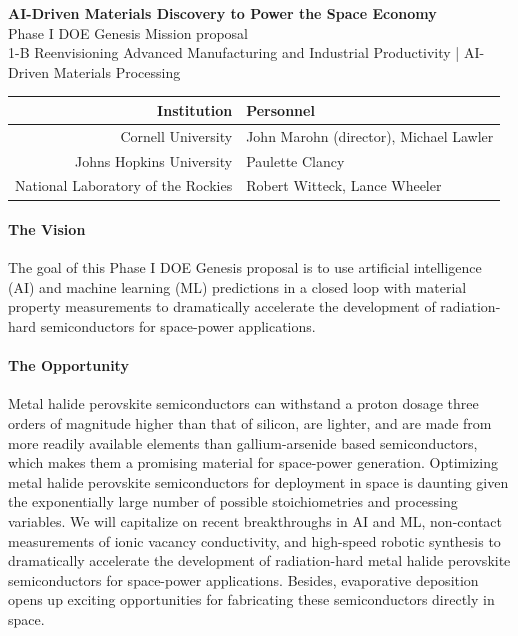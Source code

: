 \documentclass[../main.tex]{subfiles}
\begin{document}
\thispagestyle{empty}

\begin{center}
{
  \large
  \textbf{AI-Driven Materials Discovery to Power the Space Economy}
} 
\vspace{6pt} \\
Phase I DOE Genesis Mission proposal \\
1-B  Reenvisioning Advanced Manufacturing and Industrial Productivity | AI-Driven Materials Processing
\end{center}


\vspace{-6pt}

\begin{center}
\begin{tabular}{rl}
\toprule
\textbf{Institution} & \textbf{Personnel} \\
\midrule
Cornell University &  John Marohn (director), Michael Lawler  \\
Johns Hopkins University &  Paulette Clancy \\ 
National Laboratory of the Rockies & Robert Witteck, Lance Wheeler  \\
\bottomrule
\end{tabular}
\end{center}

\vspace{6pt}


\paragraph{The Vision} 
The goal of this Phase I DOE Genesis proposal is to use artificial intelligence (AI) and machine learning (ML) predictions in a closed loop with material property measurements to dramatically accelerate the development of radiation-hard semiconductors for space-power applications.  

\paragraph{The Opportunity}
Metal halide perovskite semiconductors can withstand a proton dosage three orders of magnitude higher than that of silicon, are lighter, and are made from more readily available elements than gallium-arsenide based semiconductors, which makes them a promising material for space-power generation. Optimizing metal halide perovskite semiconductors for deployment in space is daunting given the exponentially large number of possible stoichiometries and processing variables.
We will capitalize on recent breakthroughs in AI and ML, non-contact measurements of ionic vacancy conductivity, and high-speed robotic synthesis to dramatically accelerate the development of radiation-hard metal halide perovskite semiconductors for space-power applications.
Besides, evaporative deposition opens up exciting opportunities for fabricating these semiconductors directly in space.
\end{document}
